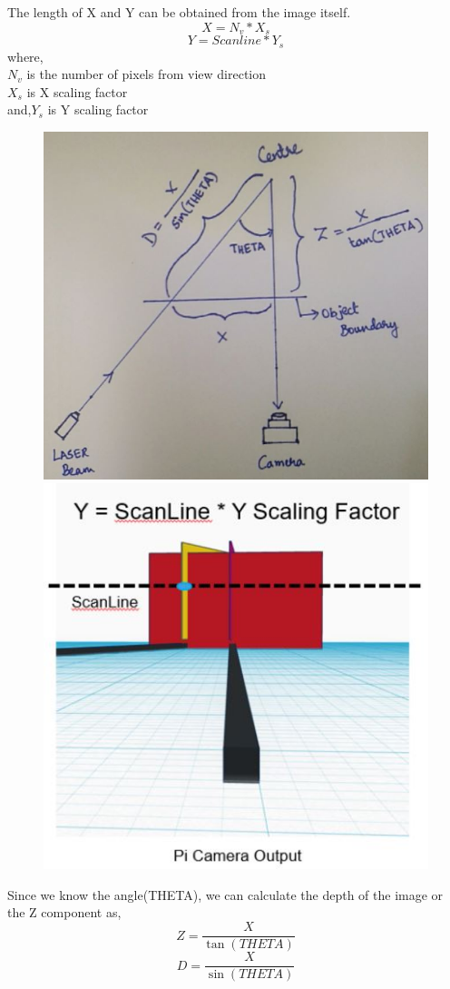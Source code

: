 \documentclass[12pt]{article}
\begin{document}
{\quad}The length of X and Y can be obtained from the image itself.
$$X=N_v * X_s$$
$$Y=Scanline * Y_s$$
where,\\
$N_v$ is the number of pixels from view direction\\
$X_s$ is X scaling factor\\
and,$Y_s$ is Y scaling factor\\
\begin{figure}[h]
\centering
\begin{minipage}{.5\textwidth}
  \centering
  \includegraphics[scale=.5]{triangle.jpg}
\end{minipage}%
\begin{minipage}{.5\textwidth}
  \centering
  \includegraphics[scale=.7]{yline.jpg}
\end{minipage}
\end{figure}
{\quad}Since we know the angle(THETA), we can calculate the depth of the image or the Z component as,
$$Z=\frac{X}{\tan(THETA)}$$
$$D=\frac{X}{\sin(THETA)}$$
\end{document}
